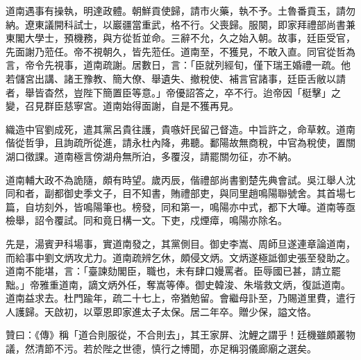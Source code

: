 \begin{pinyinscope}
道南遇事有操執，明達政體。朝鮮貢使歸，請市火藥，執不予。土魯番貢玉，請勿納。遼東議開科試士，以巖疆當重武，格不行。父喪歸。服闋，即家拜禮部尚書兼東閣大學士，預機務，與方從哲並命。三辭不允，久之始入朝。故事，廷臣受官，先面謝乃蒞任。帝不視朝久，皆先蒞任。道南至，不獲見，不敢入直。同官從哲為言，帝令先視事，道南疏謝。居數日，言：「臣就列經旬，僅下瑞王婚禮一疏。他若儲宮出講、諸王豫教、簡大僚、舉遺失、撤稅使、補言官諸事，廷臣舌敝以請者，舉皆杳然，豈陛下簡置臣等意。」帝優詔答之，卒不行。迨帝因「梃擊」之變，召見群臣慈寧宮。道南始得面謝，自是不獲再見。

織造中官劉成死，遣其黨呂貴往護，貴嗾奸民留己督造。中旨許之，命草敕。道南偕從哲爭，且詢疏所從進，請永杜內降，弗聽。鄱陽故無商稅，中官為稅使，置關湖口徵課。道南極言傍湖舟無所泊，多覆沒，請罷關勿征，亦不納。

道南輔大政不為詭隨，頗有時望。歲丙辰，偕禮部尚書劉楚先典會試。吳江舉人沈同和者，副都御史季文子，目不知書，賄禮部吏，與同里趙鳴陽聯號舍。其首場七篇，自坊刻外，皆鳴陽筆也。榜發，同和第一，鳴陽亦中式，都下大嘩。道南等亟檢舉，詔令覆試。同和竟日構一文。下吏，戍煙瘴，鳴陽亦除名。

先是，湯賓尹科場事，實道南發之，其黨側目。御史李嵩、周師旦遂連章論道南，而給事中劉文炳攻尤力。道南疏辨乞休，頗侵文炳。文炳遂極詆御史張至發助之。道南不能堪，言：「臺諫劾閣臣，職也，未有肆口嫚罵者。臣辱國已甚，請立罷黜。」帝雅重道南，謫文炳外任，奪嵩等俸。御史韓浚、朱堦救文炳，復詆道南。道南益求去。杜門踰年，疏二十七上，帝猶勉留。會繼母訃至，乃賜道里費，遣行人護歸。天啟初，以覃恩即家進太子太保。居二年卒。贈少保，謚文恪。

贊曰：《傳》稱「道合則服從，不合則去」，其王家屏、沈鯉之謂乎！廷機雖頗叢物議，然清節不污。若於陛之世德，慎行之博聞，亦足稱羽儀廊廟之選矣。


\end{pinyinscope}